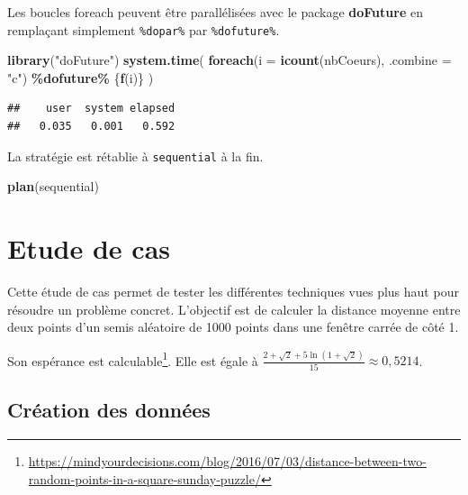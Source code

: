 \documentclass[
  12pt,
  french,
  a4paper,
  extrafontsizes,onecolumn,openright
  ]{memoir}
\newenvironment{Shaded}{\begin{snugshade}}{\end{snugshade}}
\newcommand{\AttributeTok}[1]{\textcolor[rgb]{0.13,0.29,0.53}{#1}}
\newcommand{\FunctionTok}[1]{\textcolor[rgb]{0.13,0.29,0.53}{\textbf{#1}}}
\newcommand{\NormalTok}[1]{#1}
\newcommand{\SpecialCharTok}[1]{\textcolor[rgb]{0.81,0.36,0.00}{\textbf{#1}}}
\newcommand{\StringTok}[1]{\textcolor[rgb]{0.31,0.60,0.02}{#1}}
\begin{document}
\normalsize

Les boucles foreach peuvent être parallélisées avec le package \textbf{doFuture} en remplaçant simplement \texttt{\%dopar\%} par \texttt{\%dofuture\%}.

\scriptsize

\begin{Shaded}
\begin{Highlighting}[]
\FunctionTok{library}\NormalTok{(}\StringTok{"doFuture"}\NormalTok{)}
\FunctionTok{system.time}\NormalTok{(}
  \FunctionTok{foreach}\NormalTok{(}\AttributeTok{i =} \FunctionTok{icount}\NormalTok{(nbCoeurs), }\AttributeTok{.combine =} \StringTok{"c"}\NormalTok{) }\SpecialCharTok{\%dofuture\%}\NormalTok{ \{}\FunctionTok{f}\NormalTok{(i)\}}
\NormalTok{)}
\end{Highlighting}
\end{Shaded}

\begin{verbatim}
##    user  system elapsed 
##   0.035   0.001   0.592
\end{verbatim}

\normalsize

La stratégie est rétablie à \texttt{sequential} à la fin.

\scriptsize

\begin{Shaded}
\begin{Highlighting}[]
\FunctionTok{plan}\NormalTok{(sequential)}
\end{Highlighting}
\end{Shaded}

\normalsize

\section{Etude de cas}\label{sec:cas}

Cette étude de cas permet de tester les différentes techniques vues plus haut pour résoudre un problème concret.
L'objectif est de calculer la distance moyenne entre deux points d'un semis aléatoire de 1000 points dans une fenêtre carrée de côté 1.

Son espérance est calculable\footnote{\url{https://mindyourdecisions.com/blog/2016/07/03/distance-between-two-random-points-in-a-square-sunday-puzzle/}}.
Elle est égale à \(\frac{2+\sqrt{2}+5\ln{(1+\sqrt{2})}}{15} \approx 0,5214\).

\subsection{Création des données}\label{cruxe9ation-des-donnuxe9es}
\end{document}
